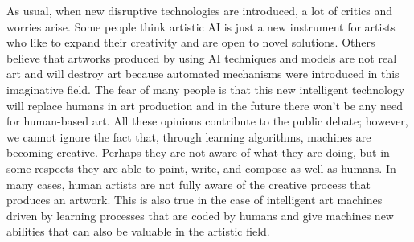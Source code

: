 As usual, when new disruptive technologies are introduced, a lot of critics and worries arise. Some people think artistic AI is just a new instrument for artists who like to expand their creativity and are open to novel solutions. Others believe that artworks produced by using AI techniques and models are not real art and will destroy art because automated mechanisms were introduced in this imaginative field. The fear of many people is that this new intelligent technology will replace humans in art production and in the future there won't be any need for human-based art. All these opinions contribute to the public debate; however, we cannot ignore the fact that, through learning algorithms, machines are becoming creative. Perhaps they are not aware of what they are doing, but in some respects they are able to paint, write, and compose as well as humans. In many cases, human artists are not fully aware of the creative process that produces an artwork. This is also true in the case of intelligent art machines driven by learning processes that are coded by humans and give machines new abilities that can also be valuable in the artistic field.


